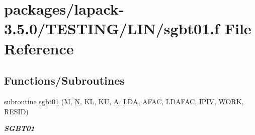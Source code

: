 \hypertarget{sgbt01_8f}{}\section{packages/lapack-\/3.5.0/\+T\+E\+S\+T\+I\+N\+G/\+L\+I\+N/sgbt01.f File Reference}
\label{sgbt01_8f}
\subsection*{Functions/\+Subroutines}
\begin{DoxyCompactItemize}
\item 
subroutine \hyperlink{group__single__lin_gacc3615c37d2cf3a48d7acb15b3991ae8}{sgbt01} (M, \hyperlink{polmisc_8c_a0240ac851181b84ac374872dc5434ee4}{N}, K\+L, K\+U, \hyperlink{classA}{A}, \hyperlink{example__user_8c_ae946da542ce0db94dced19b2ecefd1aa}{L\+D\+A}, A\+F\+A\+C, L\+D\+A\+F\+A\+C, I\+P\+I\+V, W\+O\+R\+K, R\+E\+S\+I\+D)
\begin{DoxyCompactList}\small\item\em {\bfseries S\+G\+B\+T01} \end{DoxyCompactList}\end{DoxyCompactItemize}
